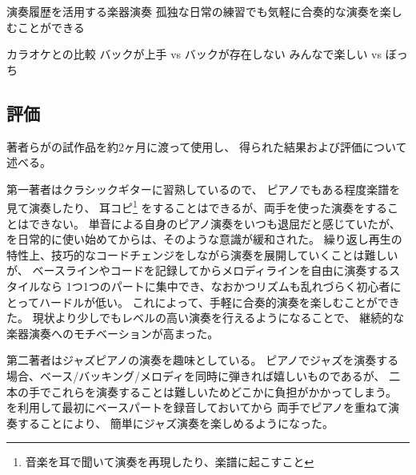 演奏履歴を活用する楽器演奏
孤独な日常の練習でも気軽に合奏的な演奏を楽しむことができる

カラオケとの比較
バックが上手 vs バックが存在しない
みんなで楽しい vs ぼっち

\subsection{評価}

著者らが{\system}の試作品を約2ヶ月に渡って使用し、
得られた結果および評価について述べる。



第一著者はクラシックギターに習熟しているので、
ピアノでもある程度楽譜を見て演奏したり、
耳コピ\footnote{\textsf{音楽を耳で聞いて演奏を再現したり、楽譜に起こすこと}}
をすることはできるが、両手を使った演奏をすることはできない。
単音による自身のピアノ演奏をいつも退屈だと感じていたが、
{\system}を日常的に使い始めてからは、そのような意識が緩和された。
繰り返し再生の特性上、技巧的なコードチェンジをしながら演奏を展開していくことは難しいが、
ベースラインやコードを記録してからメロディラインを自由に演奏するスタイルなら
1つ1つのパートに集中でき、なおかつリズムも乱れづらく初心者にとってハードルが低い。
これによって、手軽に合奏的演奏を楽しむことができた。
現状より少しでもレベルの高い演奏を行えるようになることで、
継続的な楽器演奏へのモチベーションが高まった。

第二著者はジャズピアノの演奏を趣味としている。
ピアノでジャズを演奏する場合、ベース/バッキング/メロディを同時に弾きれば嬉しいものであるが、
二本の手でこれらを演奏することは難しいためどこかに負担がかかってしまう。
{\system}を利用して最初にベースパートを録音しておいてから
両手でピアノを重ねて演奏することにより、
簡単にジャズ演奏を楽しめるようになった。

